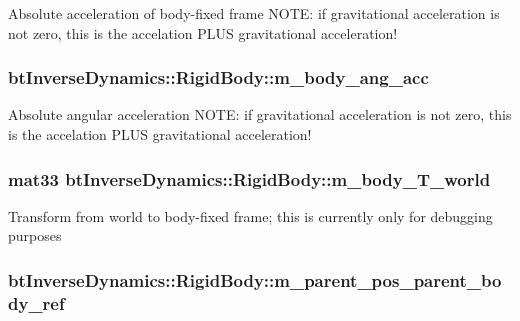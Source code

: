 Absolute acceleration of body-fixed frame NOTE: if gravitational acceleration is not zero, this is the accelation PLUS gravitational acceleration! \hypertarget{structbt_inverse_dynamics_1_1_rigid_body_8d32f2b5bcdf5f3a2566343de43ebb71}{
\subsubsection[m\_\-body\_\-ang\_\-acc]{ {\bf btInverseDynamics::RigidBody::m\_\-body\_\-ang\_\-acc}}}
\label{structbt_inverse_dynamics_1_1_rigid_body_8d32f2b5bcdf5f3a2566343de43ebb71}


Absolute angular acceleration NOTE: if gravitational acceleration is not zero, this is the accelation PLUS gravitational acceleration! \hypertarget{structbt_inverse_dynamics_1_1_rigid_body_c923bac96faf25c431d498493ed9ff0e}{
\subsubsection[m\_\-body\_\-T\_\-world]{\setlength{\rightskip}{0pt plus 5cm}mat33 {\bf btInverseDynamics::RigidBody::m\_\-body\_\-T\_\-world}}}
\label{structbt_inverse_dynamics_1_1_rigid_body_c923bac96faf25c431d498493ed9ff0e}


Transform from world to body-fixed frame; this is currently only for debugging purposes \hypertarget{structbt_inverse_dynamics_1_1_rigid_body_1bae64073eb9e0ff3f0d15c01a8bc9a1}{
\subsubsection[m\_\-parent\_\-pos\_\-parent\_\-body\_\-ref]{ {\bf btInverseDynamics::RigidBody::m\_\-parent\_\-pos\_\-parent\_\-body\_\-ref}}}
\label{structbt_inverse_dynamics_1_1_rigid_body_1bae64073eb9e0ff3f0d15c01a8bc9a1}


